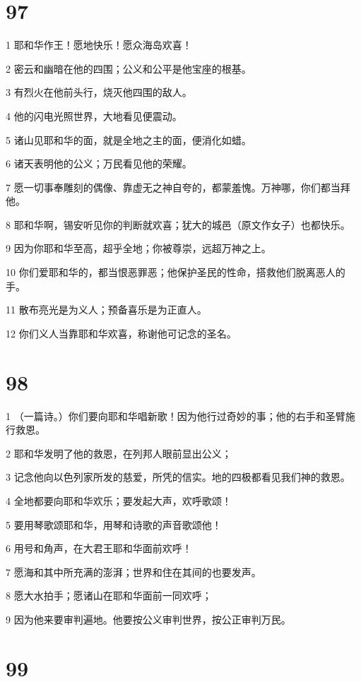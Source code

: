\chapter{97}

\par 1 耶和华作王！愿地快乐！愿众海岛欢喜！
\par 2 密云和幽暗在他的四围；公义和公平是他宝座的根基。
\par 3 有烈火在他前头行，烧灭他四围的敌人。
\par 4 他的闪电光照世界，大地看见便震动。
\par 5 诸山见耶和华的面，就是全地之主的面，便消化如蜡。
\par 6 诸天表明他的公义；万民看见他的荣耀。
\par 7 愿一切事奉雕刻的偶像、靠虚无之神自夸的，都蒙羞愧。万神哪，你们都当拜他。
\par 8 耶和华啊，锡安听见你的判断就欢喜；犹大的城邑（原文作女子）也都快乐。
\par 9 因为你耶和华至高，超乎全地；你被尊崇，远超万神之上。
\par 10 你们爱耶和华的，都当恨恶罪恶；他保护圣民的性命，搭救他们脱离恶人的手。
\par 11 散布亮光是为义人；预备喜乐是为正直人。
\par 12 你们义人当靠耶和华欢喜，称谢他可记念的圣名。

\chapter{98}

\par 1 （一篇诗。）你们要向耶和华唱新歌！因为他行过奇妙的事；他的右手和圣臂施行救恩。
\par 2 耶和华发明了他的救恩，在列邦人眼前显出公义；
\par 3 记念他向以色列家所发的慈爱，所凭的信实。地的四极都看见我们神的救恩。
\par 4 全地都要向耶和华欢乐；要发起大声，欢呼歌颂！
\par 5 要用琴歌颂耶和华，用琴和诗歌的声音歌颂他！
\par 6 用号和角声，在大君王耶和华面前欢呼！
\par 7 愿海和其中所充满的澎湃；世界和住在其间的也要发声。
\par 8 愿大水拍手；愿诸山在耶和华面前一同欢呼；
\par 9 因为他来要审判遍地。他要按公义审判世界，按公正审判万民。

\chapter{99}

